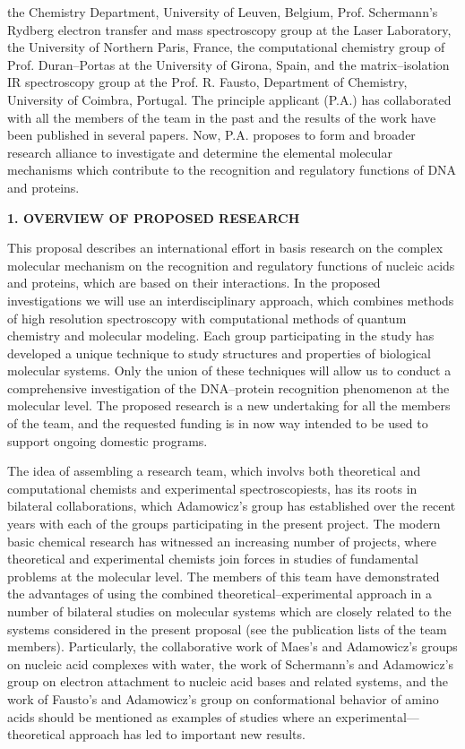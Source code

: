 the Chemistry Department, University of Leuven, Belgium,
Prof. Schermann's Rydberg electron transfer and mass spectroscopy
group at the
Laser Laboratory, the University of Northern Paris, France,
the computational
chemistry group of Prof. Duran--Portas at the University 
of Girona, Spain, and the matrix--isolation IR spectroscopy
group at the Prof. R. Fausto, Department of Chemistry,
University of Coimbra, Portugal.
The principle applicant (P.A.) has collaborated with all the members
of the team in the past and the results of the work have been
published in several papers. 
Now, P.A. proposes to form and broader research alliance to
investigate and determine the elemental molecular mechanisms
which contribute to the recognition and regulatory functions
of DNA and proteins.   

   

\newpage

\noindent
{\bf 1. OVERVIEW OF PROPOSED RESEARCH}



This proposal describes an international effort in basis research
on the complex molecular mechanism on the recognition and
regulatory functions of nucleic acids and proteins, which are
based on their interactions. 
In the proposed investigations we will use an 
interdisciplinary approach, which combines methods of 
high resolution spectroscopy with computational methods
of quantum chemistry and molecular modeling.
Each group participating in the study has developed a 
unique technique to study structures and properties of 
biological molecular systems. Only the union of these 
techniques will allow us to conduct a comprehensive 
investigation of the DNA--protein recognition
phenomenon at the molecular level.
The proposed research is a new undertaking for all the 
members of the team, and the requested funding is in now
way intended to be used to support ongoing domestic 
programs.

The idea of assembling a research team, which involvs both
theoretical and computational chemists and experimental 
spectroscopiests, has its roots in bilateral collaborations,
which Adamowicz's group has established over the recent
years with each of the
groups participating in the present project. The modern basic
chemical research has witnessed an increasing number of projects,
where theoretical and experimental chemists join forces
in studies of fundamental problems at the molecular level.
The members of this team have demonstrated the advantages
of using the combined theoretical--experimental approach in
a number of bilateral studies on molecular systems which are closely 
related to the systems considered in the present proposal (see the
publication lists
of the team members). Particularly, the collaborative work 
of Maes's and Adamowicz's groups on nucleic acid complexes with water,
the work of Schermann's and Adamowicz's group on electron
attachment to nucleic acid bases and related systems, and the 
work of Fausto's and Adamowicz's group on conformational behavior of
amino acids should be mentioned as examples of studies where
an experimental---theoretical approach has led to important new
results.

